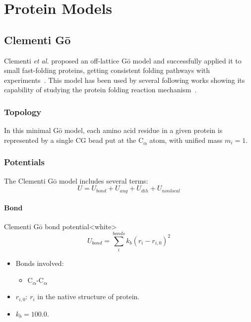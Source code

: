 \chapter{Protein Models}
\label{chap:protein}


\section{Clementi G\={o}}
\label{sec:protein_cc_go}

Clementi \emph{et al.} proposed an off-lattice G\={o} model and successfully
applied it to small fast-folding proteins, getting consistent folding pathways
with experiments~\cite{Clementi2000}.  This model has been used by several
following works showing its capability of studying the protein folding reaction
mechanism~\cite{Hoang2000, Koga2001}.

\subsection{Topology}
\label{subsec:protein_cc_go_top}

In this minimal G\={o} model, each amino acid residue in a given protein is
represented by a single CG bead put at the C\textsubscript{$\alpha$} atom, with
unified mass $m_{i} = 1$.


\subsection{Potentials}
\label{subsec:protein_cc_go_potential}

The Clementi G\={o} model includes several terms:
\begin{equation}
  \label{eq:protein_cc_go_all}
  U = U_{bond} + U_{ang} + U_{dih} + U_{nonlocal}
\end{equation}

\subsubsection{Bond}
\label{sec:protein_cc_go_potential_bond}

\begin{smallpage}{Clementi G\={o} bond potential}<white>
  \begin{equation}
    \label{eq:protein_cc_go_local_bond}
    U_{bond} = \sum_{i}^{bonds} k_b (r_i - r_{i,0})^2
  \end{equation}
  \tcblower
  \begin{itemize}
  \item Bonds involved:
    \begin{itemize}
    \item C\textsubscript{$\alpha$}-C\textsubscript{$\alpha$}
    \end{itemize}
  \item $r_{i, 0}$: $r_{i}$ in the native structure of protein.
  \item $k_b = 100.0$.
  \end{itemize}
\end{smallpage}


